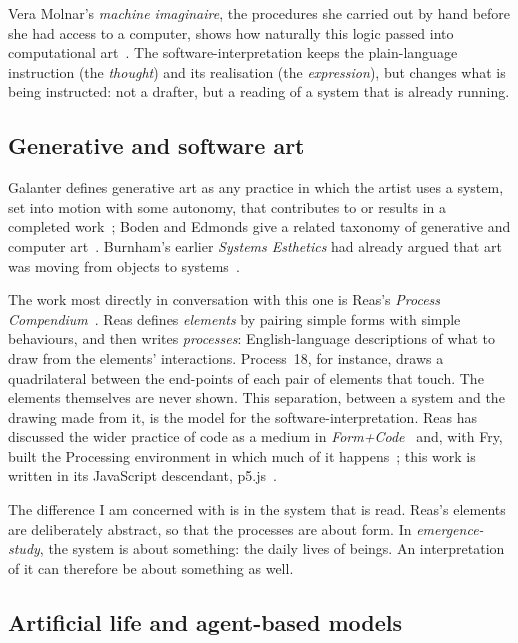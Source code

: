 Vera Molnar's \emph{machine imaginaire}, the procedures she carried out by hand before she had access to a computer, shows how naturally this logic passed into computational art~\cite{molnar1975}. The software-interpretation keeps the plain-language instruction (the \emph{thought}) and its realisation (the \emph{expression}), but changes what is being instructed: not a drafter, but a reading of a system that is already running.

\subsection{Generative and software art}

Galanter defines generative art as any practice in which the artist uses a system, set into motion with some autonomy, that contributes to or results in a completed work~\cite{galanter2003}; Boden and Edmonds give a related taxonomy of generative and computer art~\cite{boden2009}. Burnham's earlier \emph{Systems Esthetics} had already argued that art was moving from objects to systems~\cite{burnham1968}.

The work most directly in conversation with this one is Reas's \emph{Process Compendium}~\cite{reas2010, reasgithub}. Reas defines \emph{elements} by pairing simple forms with simple behaviours, and then writes \emph{processes}: English-language descriptions of what to draw from the elements' interactions. Process~18, for instance, draws a quadrilateral between the end-points of each pair of elements that touch. The elements themselves are never shown. This separation, between a system and the drawing made from it, is the model for the software-interpretation. Reas has discussed the wider practice of code as a medium in \emph{Form+Code}~\cite{reas2010formcode} and, with Fry, built the Processing environment in which much of it happens~\cite{reasfry2007}; this work is written in its JavaScript descendant, p5.js~\cite{p5js}.

The difference I am concerned with is in the system that is read. Reas's elements are deliberately abstract, so that the processes are about form. In \emph{emergence-study}, the system is about something: the daily lives of beings. An interpretation of it can therefore be about something as well.

\subsection{Artificial life and agent-based models}

